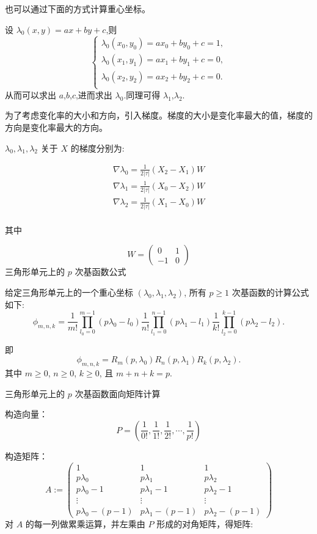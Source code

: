 \documentclass[12pt,a4paper]{article}
\begin{document}
也可以通过下面的方式计算重心坐标。

设 $\lambda_0 (x,y)=ax+by+c$,则
$$
\begin{cases}
\lambda _0 (x_0,y_0)=ax_0+by_0+c=1,\\
\lambda _0 (x_1,y_1)=ax_1+by_1+c=0,\\
\lambda _0 (x_2,y_2)=ax_2+by_2+c=0.\\
\end{cases}
$$
从而可以求出 $a$,$b$,$c$,进而求出 $\lambda _0$.同理可得 $\lambda _1$,$\lambda _2$.

为了考虑变化率的大小和方向，引入梯度。梯度的大小是变化率最大的值，梯度的方向是变化率最大的方向。

$\lambda_0, \lambda_1, \lambda_2$ 关于 $X$ 的梯度分别为:

$$
\begin{aligned}
\nabla\lambda_0 = \frac{1}{2|\tau|}(X_2 - X_1)W\\
\nabla\lambda_1 = \frac{1}{2|\tau|}(X_0 - X_2)W\\
\nabla\lambda_2 = \frac{1}{2|\tau|}(X_1 - X_0)W\\
\end{aligned}
$$

其中 

$$
W = \begin{pmatrix}
0 & 1\\ -1 & 0 
\end{pmatrix}
$$
三角形单元上的 $p$ 次基函数公式

给定三角形单元上的一个重心坐标 $(\lambda_0, \lambda_1, \lambda_2)$, 所有 $p\geq 1$ 次基函数的计算公式如下:
$$
\phi_{m,n,k} =\frac{1}{m!}\prod_{l_0 = 0}^{m - 1}(p\lambda_0 - l_0)\frac{1}{n!}\prod_{l_1 = 0}^{n - 1}(p\lambda_1 - l_1)\frac{1}{k!}\prod_{l_2 = 0}^{k - 1}(p\lambda_2 - l_2).
$$

即
$$
\phi_{m,n,k} =R_m (p,\lambda_0)R_n (p,\lambda_1)R_k (p,\lambda_2).
$$
其中 $ m\geq 0$, $n\geq 0$, $ k \geq 0$, 且 $m+n+k=p$.

三角形单元上的 $p$ 次基函数面向矩阵计算

构造向量：
$$
P = ( \frac{1}{0!},  \frac{1}{1!}, \frac{1}{2!}, \cdots, \frac{1}{p!})
$$

构造矩阵：
$$
A :=                                                                            
\begin{pmatrix}  
1  &  1  & 1 \\
p\lambda_0 & p\lambda_1 & p\lambda_2\\                                             
p\lambda_0 - 1 & p\lambda_1 - 1 & p\lambda_2 - 1\\   
\vdots & \vdots & \vdots \\                                                     
p\lambda_0 - (p - 1) & p\lambda_1 - (p - 1) & p\lambda_2 - (p - 1)
\end{pmatrix}                                                                   
$$ 
对 $A$ 的每一列做累乘运算，并左乘由 $P$ 形成的对角矩阵，得矩阵:
\end{document}
